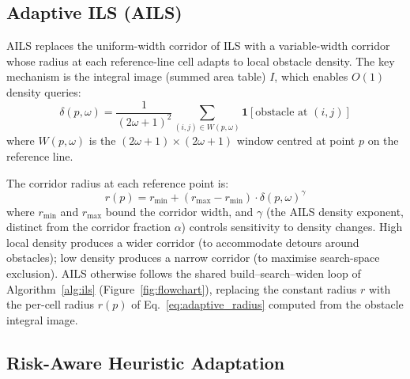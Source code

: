 \documentclass[preprint,12pt,authoryear]{elsarticle}
\begin{document}
\subsection{Adaptive ILS (AILS)}

AILS replaces the uniform-width corridor of ILS with a variable-width corridor whose radius at each reference-line cell adapts to local obstacle density.
The key mechanism is the integral image (summed area table) $I$, which enables $O(1)$ density queries:
\begin{equation}\label{eq:density}
    \delta(p, \omega) = \frac{1}{(2\omega+1)^2} \sum_{(i,j) \in W(p,\omega)} \mathbf{1}[\text{obstacle at } (i,j)]
\end{equation}
where $W(p, \omega)$ is the $(2\omega+1) \times (2\omega+1)$ window centred at point $p$ on the reference line.

The corridor radius at each reference point is:
\begin{equation}\label{eq:adaptive_radius}
    r(p) = r_{\min} + (r_{\max} - r_{\min}) \cdot \delta(p, \omega)^{\gamma}
\end{equation}
where $r_{\min}$ and $r_{\max}$ bound the corridor width, and $\gamma$ (the AILS density exponent, distinct from the corridor fraction $\alpha$) controls sensitivity to density changes.
High local density produces a wider corridor (to accommodate detours around obstacles); low density produces a narrow corridor (to maximise search-space exclusion). AILS otherwise follows the shared build--search--widen loop of Algorithm~\ref{alg:ils} (Figure~\ref{fig:flowchart}), replacing the constant radius $r$ with the per-cell radius $r(p)$ of Eq.~\eqref{eq:adaptive_radius} computed from the obstacle integral image.

\subsection{Risk-Aware Heuristic Adaptation}
\end{document}
